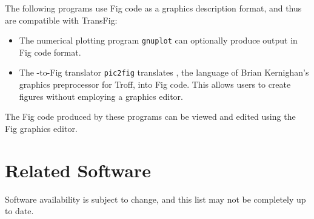 The following programs use Fig code as a graphics description format,
	and thus are compatible with TransFig:
%
\begin{itemize}

\item The numerical plotting program {\tt gnuplot} can optionally produce
	output in Fig code format.

\item The \PIC-to-Fig translator {\tt pic2fig} translates \PIC,
	the language of Brian Kernighan's graphics preprocessor for Troff,
	into Fig code.
This allows users to create figures without employing a	graphics editor.

\end{itemize}
%
The Fig code produced by these programs can be viewed and edited
	using the Fig graphics editor.

\vfill
\pagebreak
\section{Related Software}
\label{s:software}

Software availability is subject to change, and this list may not be
	completely up to date.

